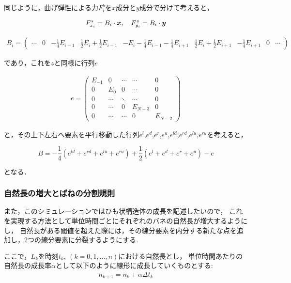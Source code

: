 同じように，曲げ弾性による力$F_{i}^{b}$を$x$成分と$y$成分で分けて考えると，

\begin{eqnarray*}
  F_{x_{i}}^{s} = B_{i} \cdot \mbox{\boldmath \(x\)}, \quad F_{y_{i}}^{s} = B_{i} \cdot \mbox{\boldmath \(y\)}
\end{eqnarray*}

\begin{eqnarray*}
  B_{i} = \left(
    \begin{array}{ccccccccc}
      \cdots & 0 & -\frac{1}{4}E_{i-1} & \frac{1}{2}E_{i} + \frac{1}{2}E_{i-1} & -E_{i} - \frac{1}{4}E_{i-1}-\frac{1}{4}E_{i+1} & \frac{1}{2}E_{i} + \frac{1}{2}E_{i+1}& -\frac{1}{4}E_{i+1} & 0 & \cdots
    \end{array}
    \right)
\end{eqnarray*}

であり，これを$z$と同様に行列$e$

\begin{eqnarray*}
  e = \left(
    \begin{array}{ccccc}
      E_{-1} & 0      & \cdots & \cdots  & 0       \\
      0      & E_{0}  & 0      & \cdots  & 0       \\
      0      & \cdots & \ddots & \cdots  & 0       \\
      0      & \cdots & 0      & E_{N-3} & 0       \\
      0      & \cdots & \cdots & 0       & E_{N-2}
    \end{array}
  \right)
\end{eqnarray*}

と，その上下左右へ要素を平行移動した行列$e^{l}$,$e^{d}$,$e^{r}$,$e^{u}$,$e^{ld}$,$e^{rd}$,$e^{lu}$,$e^{ru}$を考えると，

$$B = -\frac{1}{4}\left(e^{ld} + e^{rd} + e^{lu} + e^{ru}\right) + \frac{1}{2}\left( e^{l} + e^{d} + e^{r} + e^{u} \right) - e$$

となる．

\subsubsection{自然長の増大とばねの分割規則}

また，このシミュレーションではひも状構造体の成長を記述したいので，
これを実現する方法として単位時間ごとにそれぞれのバネの自然長が増大するようにし，
自然長がある閾値を超えた際には，その線分要素を内分する新たな点を追加し，2つの線分要素に分裂するようにする.

ここで，$L_{k}$を時刻$t_{k},\ (k = 0, 1, \dots ,n)$における自然長とし，
単位時間あたりの自然長の成長率$\alpha$として以下のように線形に成長していくものとする:
\begin{eqnarray*}
  n_{k + 1} = n_{k} + \alpha \Delta t_{k}
\end{eqnarray*}

